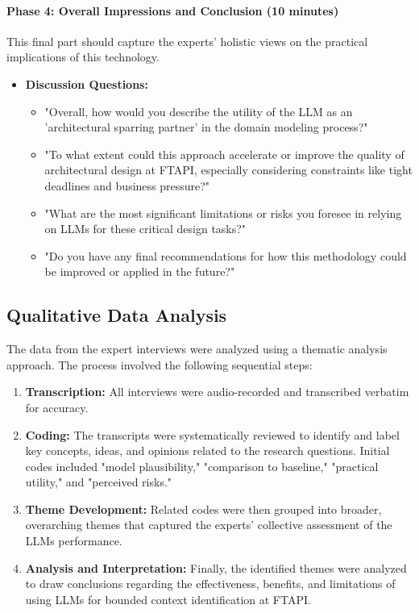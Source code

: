 \paragraph{Phase 4: Overall Impressions and Conclusion (10 minutes)}
This final part should capture the experts' holistic views on the practical implications of this technology.

\begin{itemize}
    \item \textbf{Discussion Questions:}
    \begin{itemize}
        \item "Overall, how would you describe the utility of the LLM as an 'architectural sparring partner' in the domain modeling process?"
        \item "To what extent could this approach accelerate or improve the quality of architectural design at FTAPI, especially considering constraints like tight deadlines and business pressure?"
        \item "What are the most significant limitations or risks you foresee in relying on LLMs for these critical design tasks?"
        \item "Do you have any final recommendations for how this methodology could be improved or applied in the future?"
    \end{itemize}
\end{itemize}

\subsection{Qualitative Data Analysis}
The data from the expert interviews were analyzed using a thematic analysis approach. The process involved the following sequential steps:

\begin{enumerate}[label=\arabic*., wide, labelwidth=!, labelindent=0pt, topsep=4pt, itemsep=2pt]
    \item \textbf{Transcription:} All interviews were audio-recorded and transcribed verbatim for accuracy.
    
    \item \textbf{Coding:} The transcripts were systematically reviewed to identify and label key concepts, ideas, and opinions related to the research questions. Initial codes included "model plausibility," "comparison to baseline," "practical utility," and "perceived risks."
    
    \item \textbf{Theme Development:} Related codes were then grouped into broader, overarching themes that captured the experts' collective assessment of the LLMs performance.
    
    \item \textbf{Analysis and Interpretation:} Finally, the identified themes were analyzed to draw conclusions regarding the effectiveness, benefits, and limitations of using LLMs for bounded context identification at FTAPI.
\end{enumerate}